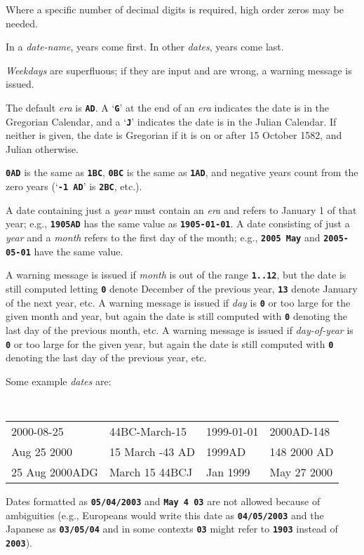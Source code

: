 \documentclass[12pt]{article}
\newcommand{\TT}[1]{{\tt \bfseries #1}}
\newenvironment{indpar}[1][0.3in]%
	{\begin{list}{}%
		     {\setlength{\itemsep}{0in}%
		      \setlength{\topsep}{0in}%
		      \setlength{\parsep}{1ex}%
		      \setlength{\labelwidth}{#1}%
		      \setlength{\leftmargin}{#1}%
		      \addtolength{\leftmargin}{\labelsep}}%
	 \item}%
	{\end{list}}
\begin{document}
Where a specific number of decimal digits is required,
high order zeros may be needed.

In a {\em date-name}, years come first.  In other {\em dates},
years come last.

{\em Weekdays} are superfluous; if they are input and are wrong,
a warning message is issued.

The default {\em era} is \TT{AD}.
A `\TT{G}' at the end of an {\em era} indicates the date is in the
Gregorian Calendar, and a `\TT{J}' indicates the date is in the Julian
Calendar.  If neither is given, the date is Gregorian if it is on
or after 15 October 1582, and Julian otherwise.

\TT{0AD} is the same as \TT{1BC}, \TT{0BC} is the same as \TT{1AD},
and negative years count from the zero years (`\TT{-1 AD}' is \TT{2BC},
etc.).

A date containing just a {\em year} must contain an {\em era}
and refers to January 1 of that
year; e.g., \TT{1905AD} has the same value as \TT{1905-01-01}.
A date consisting of just a {\em year} and a {\em month}
refers to the first day of the month;
e.g., \TT{2005 May} and \TT{2005-05-01} have the same value.

A warning message is issued if {\em month} is out of the range
\TT{1..12}, but the date is still computed letting \TT{0} denote
December of the previous year, \TT{13} denote January of the
next year, etc.  A warning message is issued if {\em day} is
\TT{0} or too large for the given month and year, but again
the date is still computed with \TT{0} denoting the last day of
the previous month, etc.
A warning message is issued if {\em day-of-year} is
\TT{0} or too large for the given year, but again
the date is still computed with \TT{0} denoting the last day of
the previous year, etc.

Some example {\em dates} are:

\begin{indpar}[0.1in]
\tt
\begin{tabular}{@{}l@{~~}l@{~~}l@{~~}l@{}}
2000-08-25	& 44BC-March-15   & 1999-01-01   & 2000AD-148 \\
Aug 25 2000	& 15 March -43 AD & 1999AD       & 148 2000 AD \\
25 Aug 2000ADG	& March 15 44BCJ  & Jan 1999     & May 27 2000 \\
\end{tabular}
\end{indpar}

Dates formatted as \TT{05/04/2003} and \TT{May 4 03} are not allowed
because of ambiguities (e.g., Europeans would write this date as
\TT{04/05/2003} and the Japanese as \TT{03/05/04} and in some contexts
\TT{03} might refer to \TT{1903} instead of \TT{2003}).
\end{document}
